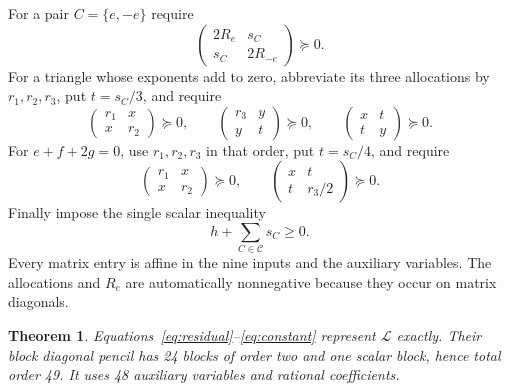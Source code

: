 \documentclass[11pt]{article}
\newtheorem{theorem}{Theorem}
\newcommand{\pos}{\succeq0}
\begin{document}
For a pair $C=\{e,-e\}$ require
\begin{equation}\label{eq:pair}
 \begin{pmatrix}2R_e&s_C\\s_C&2R_{-e}\end{pmatrix}\pos.
\end{equation}
For a triangle whose exponents add to zero, abbreviate its three
allocations by $r_1,r_2,r_3$, put $t=s_C/3$, and require
\begin{equation}\label{eq:equal}
 \begin{pmatrix}r_1&x\\x&r_2\end{pmatrix}\pos,\qquad
 \begin{pmatrix}r_3&y\\y&t\end{pmatrix}\pos,\qquad
 \begin{pmatrix}x&t\\t&y\end{pmatrix}\pos.
\end{equation}
For $e+f+2g=0$, use $r_1,r_2,r_3$ in that order, put $t=s_C/4$,
and require
\begin{equation}\label{eq:weighted}
 \begin{pmatrix}r_1&x\\x&r_2\end{pmatrix}\pos,\qquad
 \begin{pmatrix}x&t\\t&r_3/2\end{pmatrix}\pos.
\end{equation}
Finally impose the single scalar inequality
\begin{equation}\label{eq:constant}
                         h+\sum_{C\in\mathcal C}s_C\ge0.
\end{equation}
Every matrix entry is affine in the nine inputs and the auxiliary
variables. The allocations and $R_e$ are automatically nonnegative
because they occur on matrix diagonals.

\begin{theorem}\label{thm:lift}
Equations~\eqref{eq:residual}--\eqref{eq:constant} represent
$\mathcal L$ exactly. Their block diagonal pencil has 24 blocks of
order two and one scalar block, hence total order 49. It uses 48
auxiliary variables and rational coefficients.
\end{theorem}
\end{document}
